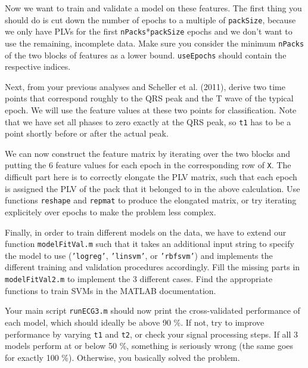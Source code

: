 \documentclass[10pt,a4paper,notitlepage]{report}
\begin{document}
Now we want to train and validate a model on these features. The first thing you should do is cut down the number of epochs to a multiple of \texttt{packSize}, because we only have PLVs for the first \texttt{nPacks}*\texttt{packSize} epochs and we don't want to use the remaining, incomplete data. Make sure you consider the minimum \texttt{nPacks} of the two blocks of features as a lower bound. \texttt{useEpochs} should contain the respective indices.

Next, from your previous analyses and Scheller et al. (2011), derive two time points that correspond roughly to the QRS peak and the T wave of the typical epoch. We will use the feature values at these two points for classification. Note that we have set all phases to zero exactly at the QRS peak, so \texttt{t1} has to be a point shortly before or after the actual peak.

We can now construct the feature matrix by iterating over the two blocks and putting the 6 feature values for each epoch in the corresponding row of \texttt{X}. The difficult part here is to correctly elongate the PLV matrix, such that each epoch is assigned the PLV of the pack that it belonged to in the above calculation. Use functions \texttt{reshape} and \texttt{repmat} to produce the elongated matrix, or try iterating explicitely over epochs to make the problem less complex.

Finally, in order to train different models on the data, we have to extend our function \texttt{modelFitVal.m} such that it takes an additional input string to specify the model to use (\texttt{'logreg'}, \texttt{'linsvm'}, or \texttt{'rbfsvm'}) and implements the different training and validation procedures accordingly. Fill the missing parts in \texttt{modelFitVal2.m} to implement the 3 different cases. Find the appropriate functions to train SVMs in the MATLAB documentation.

Your main script \texttt{runECG3.m} should now print the cross-validated performance of each model, which should ideally be above 90 \%. If not, try to improve performance by varying \texttt{t1} and \texttt{t2}, or check your signal processing steps. If all 3 models perform at or below 50 \%, something is seriously wrong (the same goes for exactly 100 \%). Otherwise, you basically solved the problem.
\end{document}
